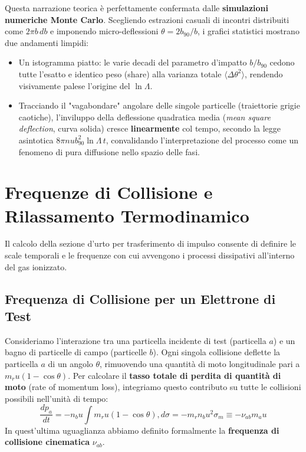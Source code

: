 Questa narrazione teorica è perfettamente confermata dalle \textbf{simulazioni numeriche Monte Carlo}. Scegliendo estrazioni casuali di incontri distribuiti come $2\pi b \, db$ e imponendo micro-deflessioni $\theta = 2b_{90}/b$, i grafici statistici mostrano due andamenti limpidi:
\begin{itemize}
\item Un istogramma piatto: le varie decadi del parametro d'impatto $b/b_{90}$ cedono tutte l'esatto e identico peso (share) alla varianza totale $\langle\Delta\theta^2\rangle$, rendendo visivamente palese l'origine del $\ln \Lambda$.
\item Tracciando il "vagabondare" angolare delle singole particelle (traiettorie grigie caotiche), l'inviluppo della deflessione quadratica media (\textit{mean square deflection}, curva solida) cresce \textbf{linearmente} col tempo, secondo la legge asintotica $8\pi n u b_{90}^2 \ln \Lambda \, t$, convalidando l'interpretazione del processo come un fenomeno di pura diffusione nello spazio delle fasi.
\end{itemize}

\section{Frequenze di Collisione e Rilassamento Termodinamico}

Il calcolo della sezione d'urto per trasferimento di impulso consente di definire le scale temporali e le frequenze con cui avvengono i processi dissipativi all'interno del gas ionizzato.

\subsection{Frequenza di Collisione per un Elettrone di Test}
Consideriamo l'interazione tra una particella incidente di test (particella $a$) e un bagno di particelle di campo (particelle $b$).
Ogni singola collisione deflette la particella $a$ di un angolo $\theta$, rimuovendo una quantità di moto longitudinale pari a $m_r u (1 - \cos\theta)$. Per calcolare il \textbf{tasso totale di perdita di quantità di moto} (rate of momentum loss), integriamo questo contributo su tutte le collisioni possibili nell'unità di tempo:
\begin{equation}
\frac{dp_a}{dt} = -n_b u \int m_r u (1 - \cos\theta) , d\sigma = -m_r n_b u^2 \sigma_m \equiv -\nu_{ab} m_a u
\end{equation}
In quest'ultima uguaglianza abbiamo definito formalmente la \textbf{frequenza di collisione cinematica} $\nu_{ab}$.


